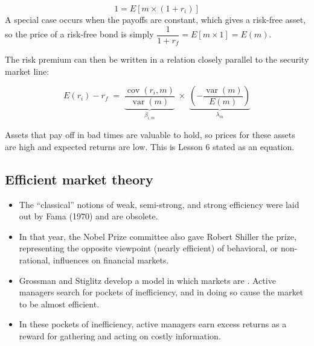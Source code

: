 \begin{imfmlbox}
\[ 1 = E\!\left[m \times (1+r_i)\right] \]
A special case occurs when the payoffs are constant, which gives a risk-free
asset, so the price of a risk-free bond is simply
$\dfrac{1}{1+r_f} = E\!\left[m \times 1\right] = E(m)$.
\end{imfmlbox}

The risk premium can then be written in a relation closely parallel to the
security market line:

\begin{imfmlbox}
\[ E(r_i) - r_f \;=\; \underbrace{\frac{\operatorname{cov}(r_i,m)}{\operatorname{var}(m)}}_{\textstyle \beta_{i,m}}
   \;\times\; \underbrace{\left(-\frac{\operatorname{var}(m)}{E(m)}\right)}_{\textstyle \lambda_m} \]
\end{imfmlbox}

\begin{imkeybox}
Assets that pay off in bad times are valuable to hold, so prices for these assets
are high and expected returns are low. This is Lesson 6 stated as an equation.
\end{imkeybox}


\subsection{Efficient market theory}

\begin{itemize}
\item The ``classical'' notions of weak, semi-strong, and strong efficiency were
laid out by Fama (1970) and are obsolete.
\item In that year, the Nobel Prize committee also gave Robert Shiller the prize,
representing the opposite viewpoint (nearly efficient) of behavioral, or
non-rational, influences on financial markets.
\item Grossman and Stiglitz develop a model in which markets are
. Active managers search for pockets of inefficiency, and in
doing so cause the market to be almost efficient.
\item In these pockets of inefficiency, active managers earn excess returns as a
reward for gathering and acting on costly information.
\end{itemize}

